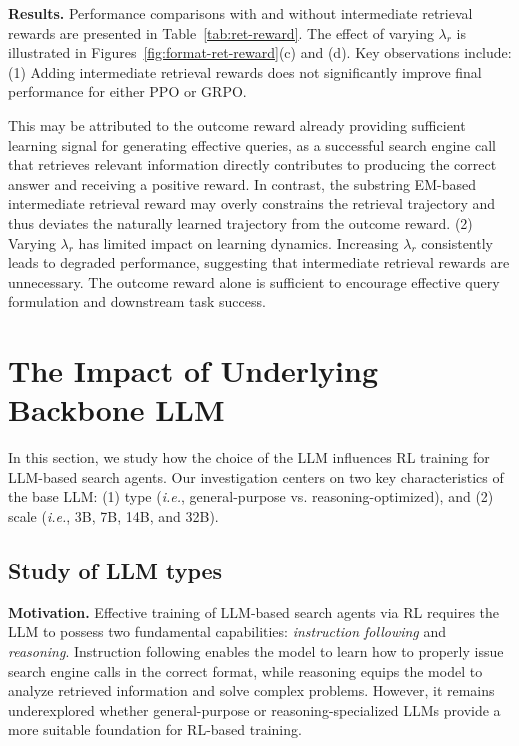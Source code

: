 \textbf{Results.} 
Performance comparisons with and without intermediate retrieval rewards are presented in Table~\ref{tab:ret-reward}.
The effect of varying $\lambda_r$ is illustrated in Figures~\ref{fig:format-ret-reward}(c) and (d).
Key observations include:
(1) Adding intermediate retrieval rewards does not significantly improve final performance for either PPO or GRPO.

This may be attributed to the outcome reward already providing sufficient learning signal for generating effective queries, as a successful search engine call that retrieves relevant information directly contributes to producing the correct answer and receiving a positive reward.
In contrast, the substring EM-based intermediate retrieval reward may overly constrains the retrieval trajectory and thus deviates the naturally learned trajectory from the outcome reward.
(2) Varying $\lambda_r$ has limited impact on learning dynamics. Increasing $\lambda_r$ consistently leads to degraded performance, suggesting that intermediate retrieval rewards are unnecessary.
The outcome reward alone is sufficient to encourage effective query formulation and downstream task success.

\section{The Impact of Underlying Backbone LLM}\label{sec:backbone-llm}
In this section, we study how the choice of the LLM influences RL training for LLM-based search agents. 
Our investigation centers on two key characteristics of the base LLM:
(1) type (\textit{i.e.}, general-purpose vs. reasoning-optimized), and
(2) scale (\textit{i.e.}, 3B, 7B, 14B, and 32B).

\subsection{Study of LLM types}\label{sec:llm-type}

\textbf{Motivation.}
Effective training of LLM-based search agents via RL requires the LLM to possess two fundamental capabilities: \textit{instruction following} and \textit{reasoning}. 
Instruction following enables the model to learn how to properly issue search engine calls in the correct format, while reasoning equips the model to analyze retrieved information and solve complex problems. 
However, it remains underexplored whether general-purpose or reasoning-specialized LLMs provide a more suitable foundation for RL-based training.

